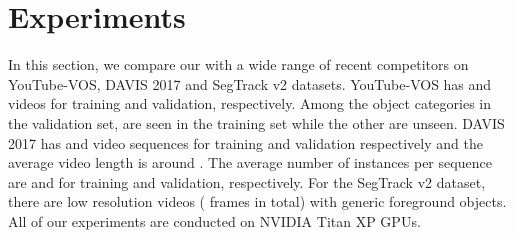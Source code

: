 \section{Experiments}

In this section, we compare our {\ourmodelshort} with a wide range of recent competitors on YouTube-VOS, DAVIS 2017 and SegTrack v2 datasets. 
YouTube-VOS has  and  videos for training and validation, respectively. Among the  object categories in the validation set,  are seen in the training set while the other  are unseen. 
DAVIS 2017 has  and  video sequences for training and validation respectively and the average video length is around .
The average number of instances per sequence are  and  for training and validation, respectively.
For the SegTrack v2 dataset, there are  low resolution videos ( frames in total) with  generic foreground objects.
All of our experiments are conducted on NVIDIA Titan XP GPUs.

\begin{table}[t]
\caption{Results on YouTube-VOS (validation set) and frame-per-second (FPS) during inference for methods withour online learning. `' and `' denote the seen and unseen categories. `OL': online learning. `+' means we use ResNet-101 as feature extractor instead of ResNet-50}
\vspace{-5mm}
\label{tab:youtubevos}
\end{table}

